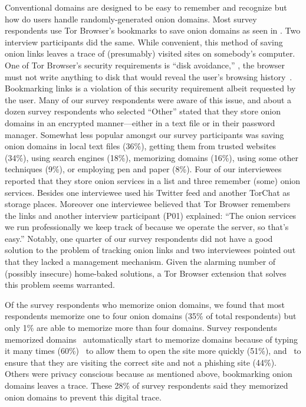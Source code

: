 Conventional domains are designed to be easy to remember and recognize but how
do users handle randomly-generated onion domains. Most survey respondents use
Tor Browser's bookmarks to save onion domains as seen in
.  Two interview participants did the same.  While
convenient, this method of saving onion links leaves a trace of (presumably)
visited sites on somebody's computer.  One of Tor Browser's security
requirements is ``disk avoidance,'' \ie, the browser must not write anything to
disk that would reveal the user's browsing history~\cite[\S~2.1]{Perry2017a}.
Bookmarking links is a violation of this security requirement albeit requested
by the user.  Many of our survey respondents were aware of this issue, and about
a dozen survey respondents who selected ``Other'' stated that they store onion
domains in an encrypted manner---either in a text file or in their password
manager.  Somewhat less popular amongst our survey participants was saving onion
domains in local text files (36\%), getting them from trusted websites (34\%),
using search engines (18\%), memorizing domains (16\%), using some other
techniques (9\%), or employing pen and paper (8\%).  Four of our interviewees
reported that they store onion services in a list and three remember (some)
onion services.  Besides one interviewee used his Twitter feed and another
TorChat as storage places.  Moreover one interviewee believed that Tor Browser
remembers the links and another interview participant (P01) explained: ``The
onion services we run professionally we keep track of because we operate the
server, so that's easy.''  Notably, one quarter of our survey respondents did
not have a good solution to the problem of tracking onion links and two
interviewees pointed out that they lacked a management mechanism.  Given the
alarming number of (possibly insecure) home-baked solutions, a Tor Browser
extension that solves this problem seems warranted.

Of the survey respondents who memorize onion domains, we found that most
respondents memorize one to four onion domains (35\% of total respondents) but
only 1\% are able to memorize more than four domains.   Survey respondents
memorized domains \first~automatically start to memorize domains because of
typing it many times (60\%) \second~to allow them to open the site more quickly
(51\%), and \third~to ensure that they are visiting the correct site and not a
phishing site (44\%). Others were privacy conscious because as mentioned above,
bookmarking onion domains leaves a trace. These 28\% of survey respondents said
they memorized onion domains to prevent this digital trace.

